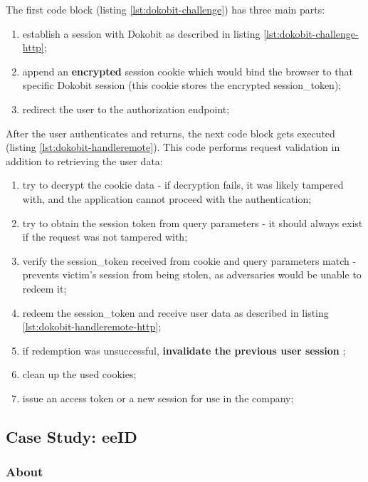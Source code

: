 The first code block (listing \ref{lst:dokobit-challenge}) has three main parts:

\begin{enumerate}
  \item establish a session with Dokobit as described in listing \ref{lst:dokobit-challenge-http};
  \item append an \textbf{encrypted} session cookie which would bind the browser to that specific Dokobit session (this cookie stores the encrypted session\_token);
  \item redirect the user to the authorization endpoint;
\end{enumerate}

After the user authenticates and returns, the next code block gets executed (listing \ref{lst:dokobit-handleremote}). This code performs request validation in addition to retrieving the user data:

\begin{enumerate}
  \item try to decrypt the cookie data - if decryption fails, it was likely tampered with, and the application cannot proceed with the authentication;
  \item try to obtain the session token from query parameters - it should always exist if the request was not tampered with;
  \item verify the session\_token received from cookie and query parameters match - prevents victim's session from being stolen, as adversaries would be unable to redeem it;
  \item redeem the session\_token and receive user data as described in listing \ref{lst:dokobit-handleremote-http};
  \item if redemption was unsuccessful, \textbf{invalidate the previous user session} \cite{video-exploitdokobit};
  \item clean up the used cookies;
  \item issue an access token or a new session for use in the company;
\end{enumerate}

\subsection{Case Study: eeID}

\subsubsection{About}

